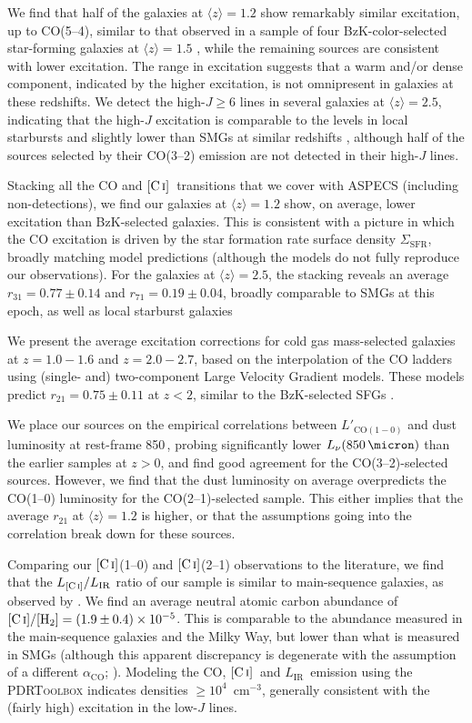 \documentclass[twocolumn]{aastex62}
\newcommand{\LIR}{\ensuremath{L_{\mathrm{IR}}}}
\newcommand{\SigmaSFR}{\ensuremath{\Sigma_{\mathrm{SFR}}}}
\newcommand{\HH}{\ensuremath{\mathrm{H}_{2}}}
\newcommand{\CIHH}{\ensuremath{\CI/[\HH]}}
\newcommand{\aco}{\ensuremath{\alpha_{\mathrm{CO}}}}
\newcommand{\avg}[1]{\ensuremath{\langle #1 \rangle}}
\newcommand{\CI}{\ensuremath{\mathrm{[C\, \textsc{i}]}}}
\newcommand{\avgCIabundCO}{\ensuremath{(1.9 \pm 0.4) \times 10^{-5}}}
\newcommand{\rTwoOneLVGzLoTwo}{\ensuremath{0.75 \pm 0.11}}
\newcommand{\rThreeOnestack}{\ensuremath{0.77 \pm 0.14}}
\newcommand{\rSevenOnestack}{\ensuremath{0.19 \pm 0.04}}
\begin{document}
We find that half of the galaxies at $\avg{z}=1.2$ show remarkably similar
excitation, up to CO(5--4), similar to that observed in a sample of four
BzK-color-selected star-forming galaxies at $\avg{z}=1.5$ \citep{Daddi2015},
while the remaining sources are consistent with lower excitation.  The range in
excitation suggests that a warm and/or dense component, indicated by the higher
excitation, is not omnipresent in galaxies at these redshifts.  We detect the
high-$J\ge6$ lines in several galaxies at $\avg{z}=2.5$, indicating that the
high-$J$ excitation is comparable to the levels in local starbursts and
slightly lower than SMGs at similar redshifts \citep{Bothwell2013}, although
half of the sources selected by their CO(3--2) emission are not detected in
their high-$J$ lines.

Stacking all the CO and \CI\ transitions that we cover with ASPECS (including
non-detections), we find our galaxies at $\avg{z}=1.2$ show, on average, lower
excitation than BzK-selected galaxies.  This is consistent with a picture in
which the CO excitation is driven by the star formation rate surface density
\SigmaSFR, broadly matching model predictions (although the models do not fully
reproduce our observations).  For the galaxies at $\avg{z}=2.5$, the stacking
reveals an average $r_{31} = \rThreeOnestack$ and $r_{71} = \rSevenOnestack$,
broadly comparable to SMGs at this epoch, as well as local starburst galaxies

We present the average excitation corrections for cold gas mass-selected
galaxies at $z=1.0-1.6$ and $z=2.0-2.7$, based on the interpolation of the CO
ladders using (single- and) two-component Large Velocity Gradient models.
These models predict $r_{21} = \rTwoOneLVGzLoTwo$ at $z<2$, similar to the
BzK-selected SFGs \citep{Daddi2015}.

We place our sources on the empirical correlations between
$L'_{\mathrm{CO}(1-0)}$ and dust luminosity at rest-frame 850\,\micron, probing
significantly lower $L_{\nu}(850\,\micron)$ than the earlier samples at $z>0$,
and find good agreement for the CO(3--2)-selected sources.  However, we find
that the dust luminosity on average overpredicts the CO(1--0) luminosity for
the CO(2--1)-selected sample.  This either implies that the average $r_{21}$ at
$\avg{z}=1.2$ is higher, or that the assumptions going into the correlation
break down for these sources.

Comparing our \CI(1--0) and \CI(2--1) observations to the literature, we find
that the $L_{\CI}/\LIR$ ratio of our sample is similar to main-sequence
galaxies, as observed by \cite{Valentino2018}.  We find an average neutral
atomic carbon abundance of $\CIHH = \avgCIabundCO$.  This is
comparable to the abundance measured in the main-sequence galaxies and the
Milky Way, but lower than what is measured in SMGs (although this apparent
discrepancy is degenerate with the assumption of a different \aco;
\citealt{Valentino2018}).  Modeling the CO, \CI\ and \LIR\ emission using the
\textsc{PDRToolbox} indicates densities $\ge 10^{4}$~cm$^{-3}$, generally
consistent with the (fairly high) excitation in the low-$J$ lines.
\end{document}
